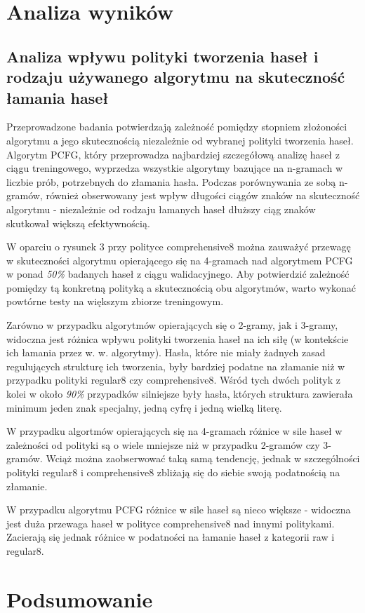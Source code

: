 \documentclass{article}
\begin{document}
	\section{Analiza wyników}
	\subsection{Analiza wpływu polityki tworzenia haseł i rodzaju używanego algorytmu na skuteczność łamania haseł}
		Przeprowadzone badania potwierdzają zależność pomiędzy stopniem złożoności algorytmu a jego skutecznością
		niezależnie od wybranej polityki tworzenia haseł. Algorytm PCFG, który przeprowadza najbardziej szczegółową
		analizę haseł z ciągu treningowego, wyprzedza wszystkie algorytmy bazujące na n-gramach w liczbie prób, potrzebnych
		do złamania hasła. Podczas porównywania ze sobą n-gramów, również obserwowany jest wpływ długości ciągów znaków
		na skuteczność algorytmu - niezależnie od rodzaju łamanych haseł dłuższy ciąg znaków skutkował większą efektywnością.

		W oparciu o rysunek 3 przy polityce comprehensive8 można zauważyć przewagę w skuteczności algorytmu
		opierającego się na 4-gramach nad algorytmem PCFG w ponad \textit{50\%} badanych haseł z ciągu walidacyjnego.
		Aby potwierdzić zależność pomiędzy tą konkretną polityką a skutecznością obu algorytmów, warto wykonać powtórne
		testy na większym zbiorze treningowym.

		Zarówno w przypadku algorytmów opierających się o 2-gramy, jak i 3-gramy, widoczna jest różnica wpływu polityki
		tworzenia haseł na ich siłę (w kontekście ich łamania przez w. w. algorytmy). Hasła, które nie miały żadnych
		zasad regulujących strukturę ich tworzenia, były bardziej podatne na złamanie niż w przypadku polityki regular8
		czy comprehensive8. Wśród tych dwóch polityk z kolei w około \textit{90\%} przypadków silniejsze były hasła,
		których struktura zawierała minimum jeden znak specjalny, jedną cyfrę i jedną wielką literę.

		W przypadku algortmów opierających się na 4-gramach różnice w sile haseł w zależności od polityki są o wiele mniejsze
		niż w przypadku 2-gramów czy 3-gramów. Wciąż można zaobserwować taką samą tendencję, jednak w szczególności
		polityki regular8 i comprehensive8 zbliżają się do siebie swoją podatnością na złamanie.

		W przypadku algorytmu PCFG różnice w sile haseł są nieco większe - widoczna jest duża przewaga haseł w polityce
		comprehensive8 nad innymi politykami. Zacierają się jednak różnice w podatności na łamanie haseł z kategorii raw
		i regular8.

	\section{Podsumowanie}
	
	\newpage
	
	
\end{document}
